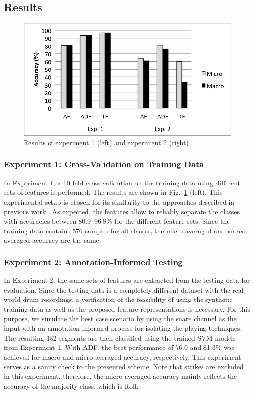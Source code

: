 \documentclass{article}
\begin{document}
\subsection{Results}\label{ssec:results}
\begin{figure}
\centering
\includegraphics[width = 8.0 cm]{./figures/exp1_exp2.png}
\caption{Results of experiment 1 (left) and experiment 2 (right)}
\label{fig:exp1n2}
\end{figure}

\subsubsection{Experiment 1: Cross-Validation on Training Data}\label{sssec:exp1}
In Experiment 1, a 10-fold cross validation on the training data using different sets of features is performed. The results are shown in Fig.~\ref{fig:exp1n2} (left). This experimental setup is chosen for its similarity to the approaches described in previous work \cite{Tindale2004, Prockup2013}. As expected, the features allow to reliably separate the classes with accuracies between 80.9--96.8\% for the different feature sets. Since the training data contains 576 samples for all classes, the micro-averaged and marco-averaged accuracy are the same.

\subsubsection{Experiment 2: Annotation-Informed Testing}\label{sssec:exp2}
In Experiment 2, the same sets of features are extracted from the testing data for evaluation. Since the testing data is a completely different dataset with the real-world drum recordings, a verification of the feasibility of using the synthetic training data as well as the proposed feature representations is necessary. For this purpose, we simulate the best case scenario by using the snare channel as the input with an annotation-informed process for isolating the playing techniques. The resulting 182 segments are then classified using the trained SVM models from Experiment 1. With ADF, the best performance of 76.0 and 81.3\% was achieved for macro and micro-averaged accuracy, respectively. This experiment serves as a sanity check to the presented scheme. %
Note that strikes are excluded in this experiment, therefore, the micro-averaged accuracy mainly reflects the accuracy of the majority class, which is Roll.
\end{document}
